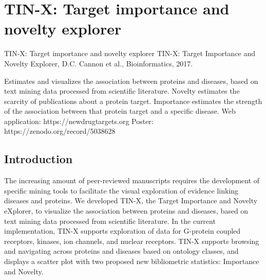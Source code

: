 \section{TIN-X: Target importance and novelty explorer}

TIN-X: Target importance and novelty explorer
TIN-X: Target Importance and Novelty Explorer, D.C. Cannon et al., Bioinformatics, 2017\cite{Cannon2017-af}.

Estimates and visualizes the association between proteins and diseases, based on text mining data processed from scientific literature.  Novelty estimates the scarcity of publications about a protein target. Importance estimates the strength of the association between that protein target and a specific disease.
Web application: https://newdrugtargets.org
Poster: https://zenodo.org/record/5038628

\subsection{Introduction}

The increasing amount of peer-reviewed manuscripts requires the development of specific mining tools to facilitate the visual exploration of evidence linking diseases and proteins. We developed TIN-X, the Target Importance and Novelty eXplorer, to visualize the association between proteins and diseases, based on text mining data processed from scientific literature. In the current implementation, TIN-X supports exploration of data for G-protein coupled receptors, kinases, ion channels, and nuclear receptors. TIN-X supports browsing and navigating across proteins and diseases based on ontology classes, and displays a scatter plot with two proposed new bibliometric statistics: Importance and Novelty. 

